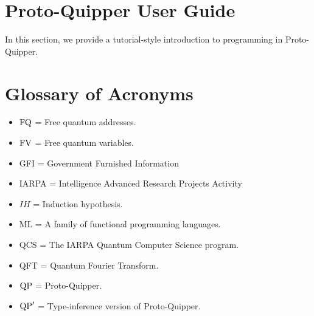 \documentclass[twoside]{article}
\begin{document}
\clearpage
\section{Proto-Quipper User Guide}
\label{sec-user-guide}

In this section, we provide a tutorial-style introduction to 
programming in Proto-Quipper. 



\clearpage
\section*{Glossary of Acronyms}

\begin{itemize}
  \item $\mathop{\textrm{FQ}}\nolimits$ = Free quantum addresses.
  \item $\mathop{\textrm{FV}}\nolimits$ = Free quantum variables.
  \item GFI = Government Furnished Information
  \item IARPA = Intelligence Advanced Research Projects Activity
  \item $IH$ = Induction hypothesis.
  \item ML = A family of functional programming languages.
  \item QCS = The IARPA Quantum Computer Science program.
  \item QFT = Quantum Fourier Transform.
  \item ${\rm QP}$ = Proto-Quipper.
  \item ${\rm QP}'$ = Type-inference version of Proto-Quipper.
\end{itemize}

\clearpage

{}

\end{document}
